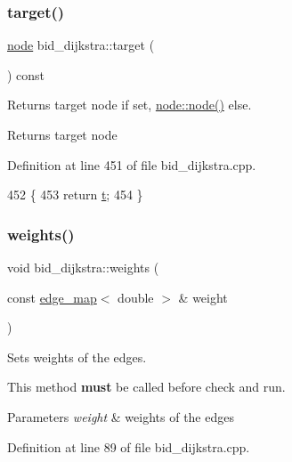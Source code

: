 \subsubsection{\texorpdfstring{target()}{target()}}
{\footnotesize\ttfamily \mbox{\hyperlink{classnode}{node}} bid\+\_\+dijkstra\+::target (\begin{DoxyParamCaption}{ }\end{DoxyParamCaption}) const}



Returns target node if set, {\ttfamily \mbox{\hyperlink{classnode_a6da4ea35f222059db9a59cf40be459f9}{node\+::node()}}} else. 

\begin{DoxyReturn}{Returns}
target node 
\end{DoxyReturn}


Definition at line 451 of file bid\+\_\+dijkstra.\+cpp.


\begin{DoxyCode}
452 \{
453     \textcolor{keywordflow}{return} \mbox{\hyperlink{classbid__dijkstra_a9370a71076d7807d1f3963e6dad9897e}{t}};
454 \}
\end{DoxyCode}
\mbox{\label{classbid__dijkstra_a33dd3a1cc5eb156b56a72235c9140e7d}} 
\subsubsection{\texorpdfstring{weights()}{weights()}}
{\footnotesize\ttfamily void bid\+\_\+dijkstra\+::weights (\begin{DoxyParamCaption}\item[{const \mbox{\hyperlink{classedge__map}{edge\+\_\+map}}$<$ double $>$ \&}]{weight }\end{DoxyParamCaption})}



Sets weights of the edges. 

This method {\bfseries must} be called before check and run.


\begin{DoxyParams}{Parameters}
{\em weight} & weights of the edges \\
\hline
\end{DoxyParams}


Definition at line 89 of file bid\+\_\+dijkstra.\+cpp.


